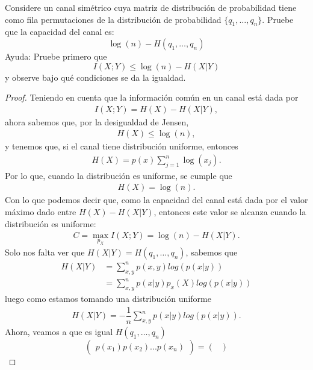 
Considere un canal simétrico cuya matriz de distribución de probabilidad tiene como fila permutaciones de la distribución de probabilidad $\{q_1, \dots, q_n\}$. Pruebe que la capacidad del canal es:
\begin{equation*}
    \log(n) - H(q_1, \dots, q_n)
\end{equation*}
Ayuda: Pruebe primero que
\begin{equation*}
    I(X;Y) \leq \log(n) - H(X|Y)
\end{equation*}
y observe bajo qué condiciones se da la igualdad.

\begin{proof}
Teniendo en cuenta que la información común en un canal está dada por
\begin{align*}
    I(X;Y) = H(X) - H(X|Y),
\end{align*}
ahora sabemos que, por la desigualdad de Jensen,
\begin{align*}
    H(X) \leq \log(n),
\end{align*}
y tenemos que, si el canal tiene distribución uniforme, entonces
\begin{align*}
    H(X) = p(x) \sum_{j=1}^{n} \log(x_j).
\end{align*}
Por lo que, cuando la distribución es uniforme, se cumple que
\begin{align*}
    H(X) = \log(n).
\end{align*}
Con lo que podemos decir que, como la capacidad del canal está dada por el valor máximo dado entre $H(X) - H(X|Y)$, entonces este valor se alcanza cuando la distribución es uniforme:
\begin{align*}
    C = \max_{p_X} I(X;Y) = \log(n) - H(X|Y).
\end{align*}
Solo nos falta ver que $H(X|Y) = H(q_1, \dots, q_n)$, sabemos que
\begin{align*}
    H(X|Y)&= \sum_{x,y}^{n}p(x,y)log(p(x|y))\\
    &=\sum_{x,y}^{n}p(x|y)p_x(X)log(p(x|y))
\end{align*}
luego como estamos tomando una distribución uniforme
\begin{align*}
    H(X|Y)=-\dfrac{1}{n}\sum_{x,y}^{n}p(x|y)log(p(x|y))
.\end{align*}
Ahora, veamos a que es igual $H(q_1, \dots, q_n)$
$$
\begin{pmatrix}
p(x_1)
p(x_2) 
\text{.}
\text{.}
\text{.}
p(x_n)
\end{pmatrix}
=
\begin{pmatrix}

\end{pmatrix}$$
\end{proof}
